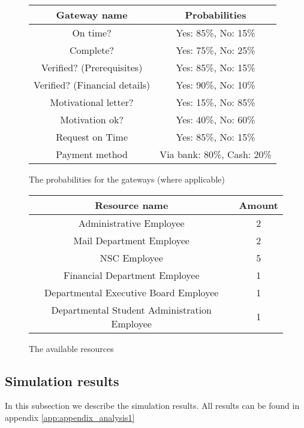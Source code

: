 \begin{figure}[h!]
	\centering
	\begin{tabular}{ | c | c | }
		\hline
		\textbf{Gateway name} & \textbf{Probabilities} \\ \hline\hline
		On time? & Yes: 85\%, No: 15\% \\ \hline
		Complete? & Yes: 75\%, No: 25\% \\ \hline
		Verified? (Prerequisites) & Yes: 85\%, No: 15\% \\ \hline
		Verified? (Financial details) & Yes: 90\%, No: 10\% \\ \hline
		Motivational letter? & Yes: 15\%, No: 85\% \\ \hline
		Motivation ok? & Yes: 40\%, No: 60\% \\ \hline
		Request on Time & Yes: 85\%, No: 15\% \\ \hline	
		Payment method & Via bank: 80\%, Cash: 20\% \\ \hline			
		\hline
	\end{tabular}
	\caption{The probabilities for the gateways (where applicable)}
	\label{fig:probabilities1}
\end{figure}

\begin{figure}[h!]
	\centering
	\begin{tabular}{ | c | c | }
		\hline
		\textbf{Resource name} & \textbf{Amount} \\ \hline\hline
		Administrative Employee & 2 \\ \hline		
		Mail Department Employee & 2 \\ \hline
		NSC Employee & 5 \\ \hline
		Financial Department Employee & 1 \\ \hline
		Departmental Executive Board Employee & 1 \\ \hline
		Departmental Student Administration Employee & 1 \\ \hline
		\hline
	\end{tabular}
	\caption{The available resources}
	\label{fig:resources1}
\end{figure}


\subsection{Simulation results}
In this subsection we describe the simulation results. All results can be found in appendix \autoref{app:appendix_analysis1}
